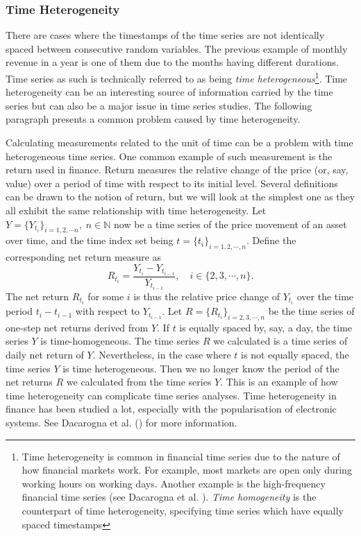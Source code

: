 \subsubsection{Time Heterogeneity}
There are cases where the timestamps of the time series are not identically spaced between consecutive random variables. The previous example of monthly revenue in a year is one of them due to the months having different durations. Time series as such is technically referred to as being \textit{time heterogeneous}\footnote{Time heterogeneity is common in financial time series due to the nature of how financial markets work. For example, most markets are open only during working hours on working days. Another example is the high-frequency financial time series (see Dacarogna et al. \citeyear{genccay2001introduction}). \textit{Time homogeneity} is the counterpart of time heterogeneity, specifying time series which have equally spaced timestamps}. Time heterogeneity can be an interesting source of information carried by the time series but can also be a major issue in time series studies. The following paragraph presents a common problem caused by time heterogeneity.

Calculating measurements related to the unit of time can be a problem with time heterogeneous time series. One common example of such measurement is the return used in finance. Return measures the relative change of the price (or, say, value) over a period of time with respect to its initial level. Several definitions can be drawn to the notion of return, but we will look at the simplest one as they all exhibit the same relationship with time heterogeneity. Let $Y = \{ Y_{t_i} \}_{i = 1, 2, \cdots n}, \; n \in \mathbb{N}$ now be a time series of the price movement of an asset over time, and the time index set being $t = \{ t_i \}_{i = 1, 2, \cdots, n}$. Define the corresponding net return measure as
\begin{equation*}
R_{t_i} = \frac{Y_{t_i} - Y_{t_{i-1}}}{Y_{t_{i-1}}}, \quad i \in \{2, 3, \cdots, n \}.
\end{equation*}
The net return $R_{t_i}$ for some $i$ is thus the relative price change of $Y_{t_i}$ over the time period $t_i - t_{i-1}$ with respect to $Y_{t_{i-1}}$. Let $R = \{ R_{t_i} \}_{i = 2, 3, \cdots, n}$ be the time series of one-step net returns derived from $Y$. If $t$ is equally spaced by, say, a day, the time series $Y$ is time-homogeneous. The time series $R$ we calculated is a time series of daily net return of $Y$. Nevertheless, in the case where $t$ is not equally spaced, the time series $Y$ is time heterogeneous. Then we no longer know the period of the net returns $R$ we calculated from the time series $Y$. This is an example of how time heterogeneity can complicate time series analyses. Time heterogeneity in finance has been studied a lot, especially with the popularisation of electronic systems. See Dacarogna et al. (\citeyear{genccay2001introduction}) for more information.

